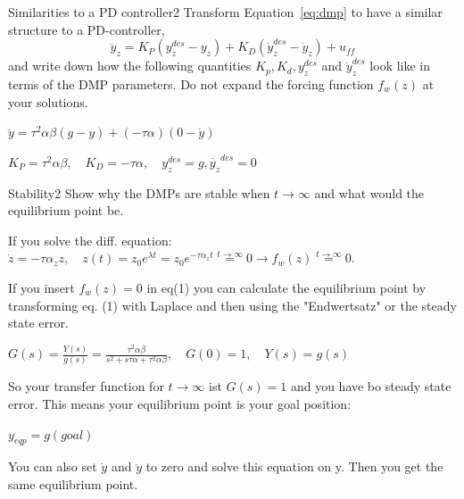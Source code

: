 \begin{questions}


\begin{question}{Similarities to a PD controller}{2}
Transform Equation~\eqref{eq:dmp} to have a similar structure to a PD-controller,
%
\begin{equation}
    \ddot{y}_z = K_P ( y^{des}_z - y_z ) + K_D ( \dot{y}_z^{des} - \dot{y}_z ) +
    u_{ff}
\end{equation}
%
and write down how the following quantities $K_p, K_d, y^{des}_z$ and $\dot{y}_z^{des}$ look like in terms of the DMP parameters. Do not expand the forcing function $f_w(z)$ at your solutions.

\begin{answer}
	$\ddot{y}=\tau^2 \alpha \beta (g-y) + (-\tau \alpha) (0-\dot{y}) $	
	
	$K_P = \tau^2 \alpha \beta, \quad K_D= - \tau \alpha, \quad y_z^{des} = g , \dot{y_z}^{des}=0$
	\end{answer}

\end{question}


\begin{question}{Stability}{2}
Show why the DMPs are stable when $t\to\infty$ and what would the equilibrium point be.

\begin{answer}
	If you solve the diff. equation: $\dot{z}=-\tau\alpha_z z, \quad z(t)= z_0 e^{\lambda t}=z_0 e^{-\tau \alpha_z t} \overset{t \rightarrow \infty}{=}0 \rightarrow f_w(z) \overset{t \rightarrow \infty}{=}0 $.
	
	If you insert $f_w(z)=0$ in eq(1) you can calculate the equilibrium point by transforming eq. (1) with Laplace and then using the "Endwertsatz" or the steady state error.
	
	$G(s)=\frac{Y(s)}{g(s)}= \frac{\tau^2 \alpha \beta}{s^2 + s \tau \alpha + \tau^2 \alpha \beta },\quad G(0) = 1,\quad Y(s)=g(s)$
	
	So your transfer function for $t \rightarrow \infty$ ist $G(s)=1$ and you have bo steady state error. This means your equilibrium point is your goal position: 
	
	$y_{eqp}=g (goal)$ 

	You can also set $\dot{y}$ and $\ddot{y}$ to zero and solve this equation on y. Then you get the same equilibrium point.
	\end{answer}


\end{question}
\end{questions}
